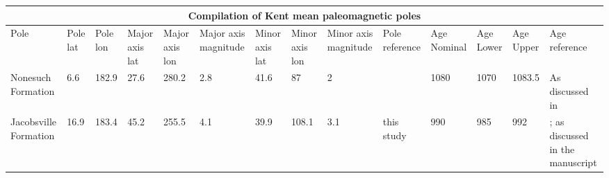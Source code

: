 \clearpage

\begin{table}
\begin{scriptsize}
\begin{tabular}{p{1.5cm}p{1cm}p{1cm}p{1cm}p{1cm}p{1cm}p{1cm}p{1cm}p{1cm}p{1cm}p{1cm}p{1cm}p{1cm}p{2cm}}
\hline
\multicolumn{14}{c}{Compilation of Kent mean paleomagnetic poles}                                                                                                                                                                                           \\ \hline 
Pole                  & Pole lat & Pole lon & Major axis lat & Major axis lon & Major axis magnitude & Minor axis lat & Minor axis lon & Minor axis magnitude & Pole reference         & Age Nominal & Age Lower & Age Upper & Age reference                                       \\
Nonesuch Formation    & 6.6      & 182.9    & 27.6           & 280.2          & 2.8                  & 41.6           & 87             & 2                    & \cite{Slotznick2023a} & 1080       & 1070     & 1083.5   & As discussed in \cite{Swanson-Hysell2019a}         \\
Jacobsville Formation & 16.9    & 183.4    & 45.2           & 255.5          & 4.1                    & 39.9           & 108.1          & 3.1                  & this study             & 990        & 985      & 992     & \cite{Hodgin2022a}; as discussed in the manuscript
\end{tabular}
\end{scriptsize}
\end{table}

\clearpage


